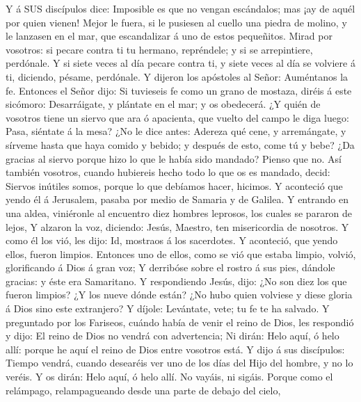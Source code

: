  Y á SUS discípulos dice: Imposible es que no vengan
escándalos; mas ¡ay de aquél por quien vienen!  Mejor le
fuera, si le pusiesen al cuello una piedra de molino, y le lanzasen en
el mar, que escandalizar á uno de estos pequeñitos.  Mirad
por vosotros: si pecare contra ti tu hermano, repréndele; y si se
arrepintiere, perdónale.  Y si siete veces al día pecare
contra ti, y siete veces al día se volviere á ti, diciendo, pésame,
perdónale.  Y dijeron los apóstoles al Señor: Auméntanos la
fe.  Entonces el Señor dijo: Si tuvieseis fe como un grano
de mostaza, diréis á este sicómoro: Desarráigate, y plántate en el mar;
y os obedecerá.  ¿Y quién de vosotros tiene un siervo que
ara ó apacienta, que vuelto del campo le diga luego: Pasa, siéntate á la
mesa?  ¿No le dice antes: Adereza qué cene, y arremángate, y
sírveme hasta que haya comido y bebido; y después de esto, come tú y
bebe?  ¿Da gracias al siervo porque hizo lo que le había
sido mandado? Pienso que no.  Así también vosotros, cuando
hubiereis hecho todo lo que os es mandado, decid: Siervos inútiles
somos, porque lo que debíamos hacer, hicimos.  Y aconteció
que yendo él á Jerusalem, pasaba por medio de Samaria y de Galilea.
 Y entrando en una aldea, viniéronle al encuentro diez
hombres leprosos, los cuales se pararon de lejos,  Y
alzaron la voz, diciendo: Jesús, Maestro, ten misericordia de nosotros.
 Y como él los vió, les dijo: Id, mostraos á los
sacerdotes. Y aconteció, que yendo ellos, fueron limpios. 
Entonces uno de ellos, como se vió que estaba limpio, volvió,
glorificando á Dios á gran voz;  Y derribóse sobre el
rostro á sus pies, dándole gracias: y éste era Samaritano. 
Y respondiendo Jesús, dijo: ¿No son diez los que fueron limpios? ¿Y los
nueve dónde están?  ¿No hubo quien volviese y diese gloria
á Dios sino este extranjero?  Y díjole: Levántate, vete; tu
fe te ha salvado.  Y preguntado por los Fariseos, cuándo
había de venir el reino de Dios, les respondió y dijo: El reino de Dios
no vendrá con advertencia;  Ni dirán: Helo aquí, ó helo
allí: porque he aquí el reino de Dios entre vosotros está. 
Y dijo á sus discípulos: Tiempo vendrá, cuando desearéis ver uno de los
días del Hijo del hombre, y no lo veréis.  Y os dirán: Helo
aquí, ó helo allí. No vayáis, ni sigáis.  Porque como el
relámpago, relampagueando desde una parte de debajo del cielo,
